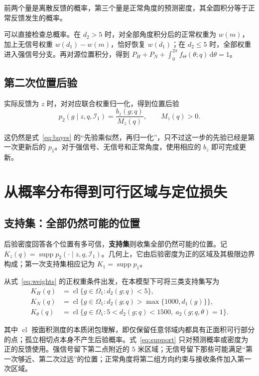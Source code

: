 \documentclass[UTF8,a4paper,zihao=-4,fontset=none]{ctexart}
\numberwithin{equation}{section}
\newcommand{\dd}{\,\mathrm d}
\newcommand{\supp}{\operatorname{supp}}
\newcommand{\cl}{\operatorname{cl}}
\begin{document}
前两个量是离散反馈的概率，第三个量是正常角度的预测密度，其全圆积分等于正常反馈发生的概率。

可以直接检查总概率。在 \(d_2>5\) 时，对全部角度积分后的正常权重为 \(w(m)\)，加上无信号权重 \(w(d_1)-w(m)\)，恰好恢复 \(w(d_1)\)；在 \(d_2\le5\) 时，全部权重进入强信号分支。再对源位置积分，得到 \(P_H+P_N+\int_0^{2\pi}f_\Theta(\theta;q)\dd\theta=1\)。

\subsection{第二次位置后验}
实际反馈为 \(z\) 时，对对应联合权重归一化，得到位置后验
\begin{equation}\label{eq:posterior2}
p_2(g\mid z,q,\mathcal I_1)=\frac{b_z(g;q)}{M_z(q)},\qquad M_z(q)>0.
\end{equation}

这仍然是式~\eqref{eq:bayes} 的“先验乘似然，再归一化”，只不过这一步的先验已经是第一次更新后的 \(p_1\)。对于强信号、无信号和正常角度，使用相应的 \(b_z\) 即可完成更新。

\section{从概率分布得到可行区域与定位损失}
\subsection{支持集：全部仍然可能的位置}
后验密度回答各个位置有多可信，\textbf{支持集}则收集全部仍然可能的位置。记 \(K_z(q)=\supp p_2(\cdot\mid z,q,\mathcal I_1)\)。几何上，它由后验密度为正的区域及其极限边界构成；第一次支持集相应记为 \(K_1=\supp p_1\)。

从式~\eqref{eq:weights} 的正权重条件出发，在本模型下可将三类支持集写为
\begin{equation}\label{eq:support}
\begin{aligned}
K_H(q)&=\cl\{g\in\Omega_1:d_2(g;q)<5\},\\
K_N(q)&=\cl\{g\in\Omega_1:d_2(g;q)>\max\{1000,d_1(g)\}\},\\
K_\theta(q)&=\cl\{g\in\Omega_1:5<d_2(g;q)<1500,\ a_2(g;q,\theta)=1\}.
\end{aligned}
\end{equation}

其中 \(\cl\) 按面积测度的本质闭包理解，即仅保留任意邻域内都具有正面积可行部分的点；孤立相切点本身不产生后验概率。式~\eqref{eq:support} 只对预测概率或密度为正的反馈使用。强信号留下第二点附近的 \(5\) 米区域；无信号留下那些可能满足“第一次够近、第二次过远”的位置；正常角度将第二组方向约束与接收条件加入第一次区域。
\end{document}
